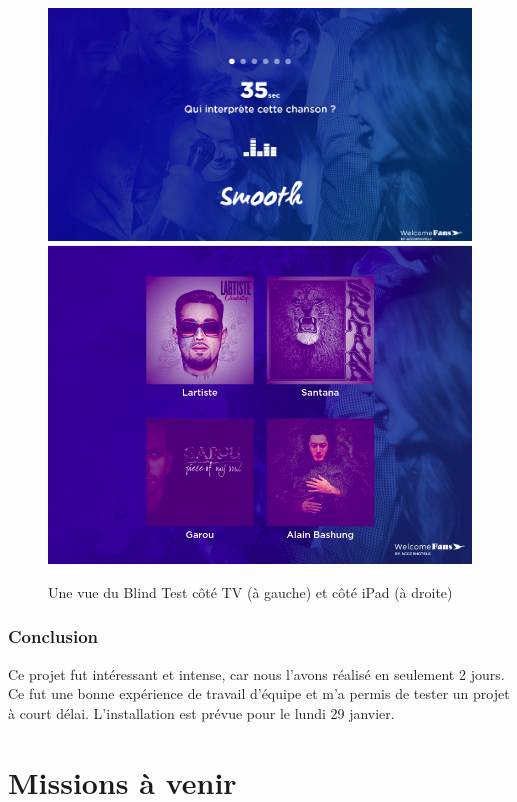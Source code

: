 \documentclass{article}
\begin{document}
\begin{figure}[h]
    \centering
    \includegraphics[scale=0.23]{blind-test-tv.png}
    \includegraphics[scale=0.22]{blind-test-ipad.png}
    \caption{Une vue du Blind Test côté TV (à gauche) et côté iPad (à droite)}
\end{figure}

\subsubsection{Conclusion}

Ce projet fut intéressant et intense, car nous l'avons réalisé en seulement 2 jours.
Ce fut une bonne expérience de travail d'équipe et m'a permis de tester un projet à court délai.
L'installation est prévue pour le lundi 29 janvier.

\clearpage

\section{Missions à venir}
\end{document}
